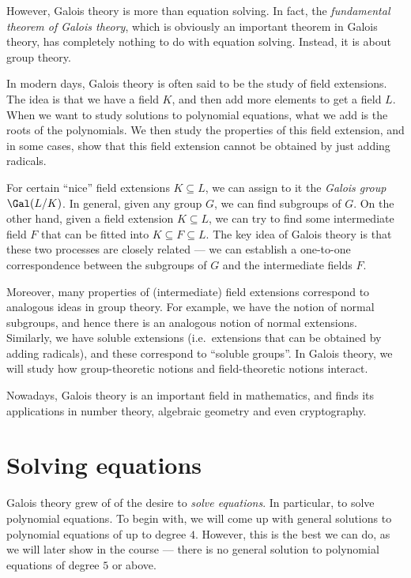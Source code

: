 \documentclass[a4paper]{article}
\begin{document}
However, Galois theory is more than equation solving. In fact, the \emph{fundamental theorem of Galois theory}, which is obviously an important theorem in Galois theory, has completely nothing to do with equation solving. Instead, it is about group theory.

In modern days, Galois theory is often said to be the study of field extensions. The idea is that we have a field $K$, and then add more elements to get a field $L$. When we want to study solutions to polynomial equations, what we add is the roots of the polynomials. We then study the properties of this field extension, and in some cases, show that this field extension cannot be obtained by just adding radicals.

For certain ``nice'' field extensions $K \subseteq L$, we can assign to it the \emph{Galois group} $\Gal(L/K)$. In general, given any group $G$, we can find subgroups of $G$. On the other hand, given a field extension $K\subseteq L$, we can try to find some intermediate field $F$ that can be fitted into $K \subseteq F \subseteq L$. The key idea of Galois theory is that these two processes are closely related --- we can establish a one-to-one correspondence between the subgroups of $G$ and the intermediate fields $F$.

Moreover, many properties of (intermediate) field extensions correspond to analogous ideas in group theory. For example, we have the notion of normal subgroups, and hence there is an analogous notion of normal extensions. Similarly, we have soluble extensions (i.e.\ extensions that can be obtained by adding radicals), and these correspond to ``soluble groups''. In Galois theory, we will study how group-theoretic notions and field-theoretic notions interact.

Nowadays, Galois theory is an important field in mathematics, and finds its applications in number theory, algebraic geometry and even cryptography.

\section{Solving equations}
Galois theory grew of of the desire to \emph{solve equations}. In particular, to solve polynomial equations. To begin with, we will come up with general solutions to polynomial equations of up to degree $4$. However, this is the best we can do, as we will later show in the course --- there is no general solution to polynomial equations of degree $5$ or above.
\end{document}
